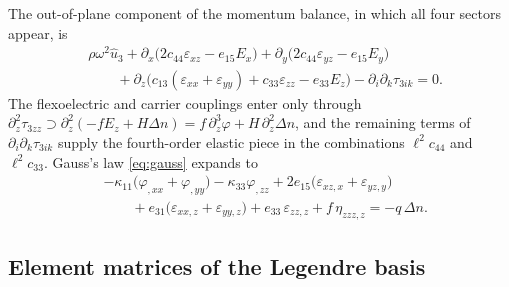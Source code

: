 The out-of-plane component of the momentum balance, in which all four sectors appear, is
\begin{equation*}
\begin{aligned}
&\rho\omega^{2}\widehat u_3
+\partial_x\bigl(2c_{44}\varepsilon_{xz}-e_{15}E_x\bigr)
+\partial_y\bigl(2c_{44}\varepsilon_{yz}-e_{15}E_y\bigr)\\
&\qquad
+\partial_z\bigl(c_{13}(\varepsilon_{xx}+\varepsilon_{yy})
+c_{33}\varepsilon_{zz}-e_{33}E_z\bigr)
-\partial_i\partial_k\tau_{3ik}=0 .
\end{aligned}
\end{equation*}
The flexoelectric and carrier couplings enter only through $\partial_z^{2}\tau_{3zz}\supset\partial_z^{2}(-fE_z+H\Delta n)=f\,\partial_z^{3}\varphi+H\,\partial_z^{2}\Delta n$, and the remaining terms of $\partial_i\partial_k\tau_{3ik}$ supply the fourth-order elastic piece in the combinations $\ell^{2}c_{44}$ and $\ell^{2}c_{33}$.  Gauss's law \eqref{eq:gauss} expands to
\begin{equation*}
\begin{aligned}
&-\kappa_{11}\bigl(\varphi_{,xx}+\varphi_{,yy}\bigr)
-\kappa_{33}\varphi_{,zz}
+2e_{15}\bigl(\varepsilon_{xz,x}+\varepsilon_{yz,y}\bigr)\\
&\qquad
+e_{31}\bigl(\varepsilon_{xx,z}+\varepsilon_{yy,z}\bigr)
+e_{33}\,\varepsilon_{zz,z}
+f\,\eta_{zzz,z}
=-q\,\Delta n .
\end{aligned}
\end{equation*}

\subsection{Element matrices of the Legendre basis}

